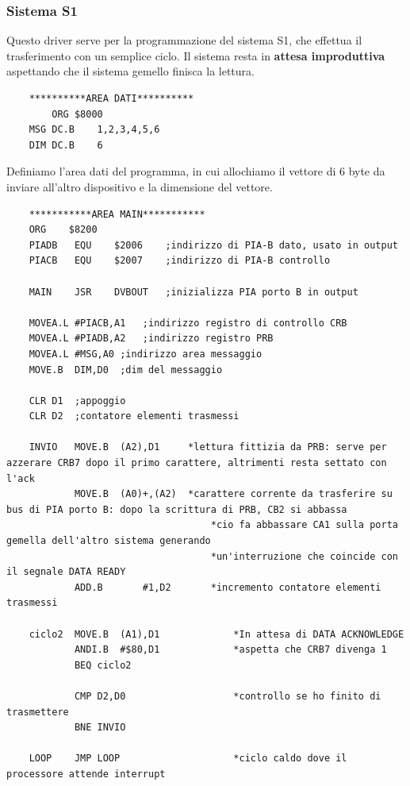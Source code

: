 \subsubsection{Sistema S1} \label{par:es_1_1_1}
Questo driver serve per la programmazione del sistema S1, che effettua il trasferimento con un semplice ciclo. Il sistema resta in \textbf{attesa improduttiva} aspettando che il sistema gemello finisca la lettura. 

\begin{lstlisting}
    **********AREA DATI**********
	    ORG	$8000
	MSG	DC.B	1,2,3,4,5,6
    DIM	DC.B	6
\end{lstlisting}

Definiamo l'area dati del programma, in cui allochiamo il vettore di 6 byte da inviare all'altro dispositivo e la dimensione del vettore. 

\begin{lstlisting}
    ***********AREA MAIN***********	
	ORG    $8200
    PIADB	EQU    $2006	;indirizzo di PIA-B dato, usato in output 
    PIACB	EQU    $2007	;indirizzo di PIA-B controllo

    MAIN	JSR    DVBOUT	;inizializza PIA porto B in output

	MOVEA.L	#PIACB,A1	;indirizzo registro di controllo CRB
	MOVEA.L	#PIADB,A2	;indirizzo registro PRB
	MOVEA.L	#MSG,A0	;indirizzo area messaggio
	MOVE.B	DIM,D0	;dim del messaggio
	
	CLR	D1	;appoggio
	CLR	D2	;contatore elementi trasmessi

    INVIO	MOVE.B	(A2),D1     *lettura fittizia da PRB: serve per azzerare CRB7 dopo il primo carattere, altrimenti resta settato con l'ack
            MOVE.B	(A0)+,(A2)	*carattere corrente da trasferire su bus di PIA porto B: dopo la scrittura di PRB, CB2 si abbassa
    								*cio fa abbassare CA1 sulla porta gemella dell'altro sistema generando 
    								*un'interruzione che coincide con il segnale DATA READY
            ADD.B		#1,D2		*incremento contatore elementi trasmessi

    ciclo2	MOVE.B	(A1),D1		        *In attesa di DATA ACKNOWLEDGE
            ANDI.B	#$80,D1				*aspetta che CRB7 divenga 1
            BEQ	ciclo2

            CMP	D2,D0	                *controllo se ho finito di trasmettere
            BNE	INVIO

    LOOP  	JMP LOOP	                *ciclo caldo dove il processore attende interrupt		
\end{lstlisting}

